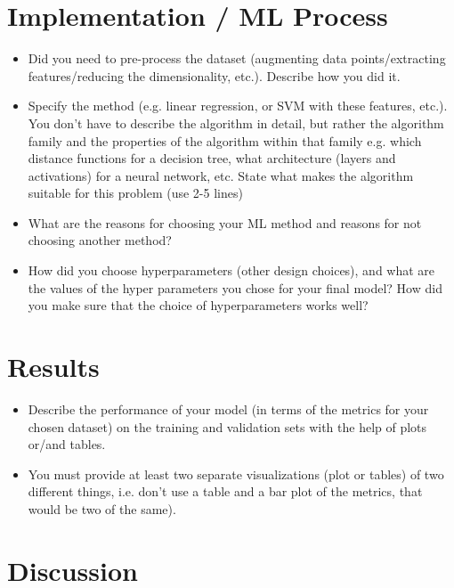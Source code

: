 \documentclass[a4, 10 pt, conference]{ieeeconf}  %
\begin{document}
\section{Implementation / ML Process}
\label{sec:methods}

{\color{blue}

\begin{itemize}
	\item Did you need to pre-process the dataset (augmenting data points/extracting features/reducing the dimensionality, etc.). Describe how you did it.
	\item Specify the method (e.g. linear regression, or SVM with these features, etc.). You don't have to describe the algorithm in detail, but rather the algorithm family and the properties of the algorithm within that family e.g. which distance functions for a decision tree, what architecture (layers and activations) for a neural network, etc. State what makes the algorithm suitable for this problem (use 2-5 lines)
	\item What are the reasons for choosing your ML method and reasons for not choosing another method?
	\item How did you choose hyperparameters (other design choices), and what are the values of the hyper parameters you chose for your final model? How did you make sure that the choice of hyperparameters works well?
\end{itemize}
}

\section{Results}
\label{sec:results}

{\color{blue}

\begin{itemize}
	\item Describe the performance of your model (in terms of the metrics for your chosen dataset) on the training and validation sets with the help of plots or/and tables.
	\item You must provide at least two separate visualizations (plot or tables) of two different things, i.e. don’t use a table and a bar plot of the metrics, that would be two of the same).
\end{itemize}
}

\section{Discussion}
\label{sec:discuss}
\end{document}
